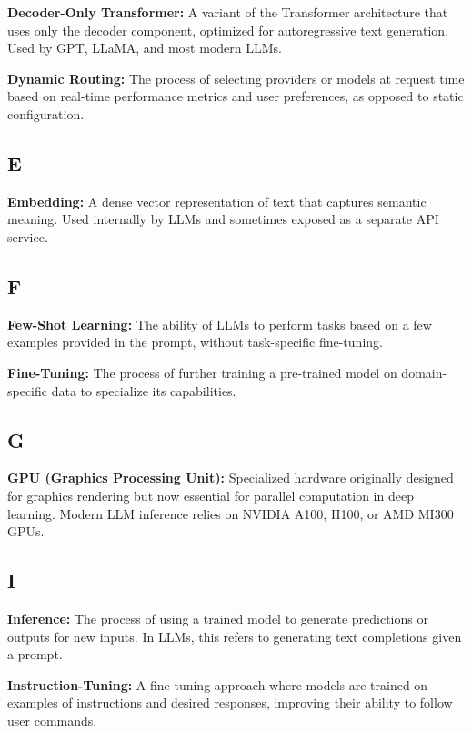 \documentclass[english]{article}
\begin{document}
\textbf{Decoder-Only Transformer:} A variant of the Transformer architecture that uses only the decoder component, optimized for autoregressive text generation. Used by GPT, LLaMA, and most modern LLMs.

\textbf{Dynamic Routing:} The process of selecting providers or models at request time based on real-time performance metrics and user preferences, as opposed to static configuration.

\subsection*{E}

\textbf{Embedding:} A dense vector representation of text that captures semantic meaning. Used internally by LLMs and sometimes exposed as a separate API service.

\subsection*{F}

\textbf{Few-Shot Learning:} The ability of LLMs to perform tasks based on a few examples provided in the prompt, without task-specific fine-tuning.

\textbf{Fine-Tuning:} The process of further training a pre-trained model on domain-specific data to specialize its capabilities.

\subsection*{G}

\textbf{GPU (Graphics Processing Unit):} Specialized hardware originally designed for graphics rendering but now essential for parallel computation in deep learning. Modern LLM inference relies on NVIDIA A100, H100, or AMD MI300 GPUs.

\subsection*{I}

\textbf{Inference:} The process of using a trained model to generate predictions or outputs for new inputs. In LLMs, this refers to generating text completions given a prompt.

\textbf{Instruction-Tuning:} A fine-tuning approach where models are trained on examples of instructions and desired responses, improving their ability to follow user commands.
\end{document}
